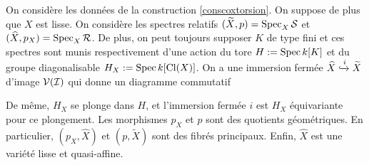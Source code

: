 \begin{cons}\label{conscoxtorsionlisse}
On considère les données de la construction \ref{conscoxtorsion}. On suppose de plus que $X$ est lisse. On considère les spectres relatifs $(\widetilde{X}, p)=\operatorname{Spec}_X \mathcal{S}$ et $(\widehat{X},p_X)=\operatorname{Spec}_X \mathcal{R}$. De plus, on peut toujours supposer $K$ de type fini et ces spectres sont munis respectivement d'une action du tore $H:=\operatorname{Spec} k[K]$ et du groupe diagonalisable $H_X:=\operatorname{Spec} k[\operatorname{Cl}(X)]$. On a une immersion fermée $\widehat{X}\xhookrightarrow{i}\widetilde{X}$ d'image $\mathcal{V}(\mathcal{I})$ qui donne un diagramme commutatif

	\begin{center}
	\end{center}
De même, $H_X$ se plonge dans $H$, et l'immersion fermée $i$ est $H_X$ équivariante pour ce plongement. Les morphismes $p_X$ et $p$ sont des quotients géométriques. En particulier, $(p_X, \widehat{X})$ et $(p, \widetilde{X})$ sont des fibrés principaux. Enfin, $\widehat{X}$ est une variété lisse et quasi-affine.
\end{cons}
